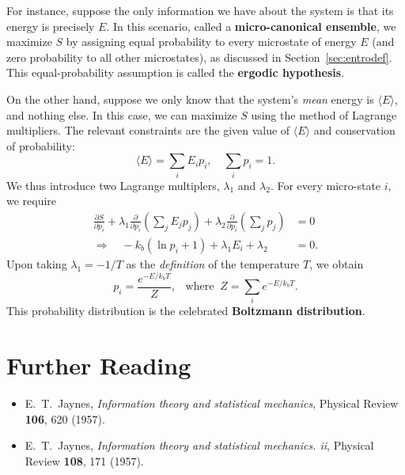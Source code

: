 \documentclass[pra,12pt]{revtex4}
\begin{document}
For instance, suppose the only information we have about the system is
that its energy is precisely $E$.  In this scenario, called a
\textbf{micro-canonical ensemble}, we maximize $S$ by assigning equal
probability to every microstate of energy $E$ (and zero probability to
all other microstates), as discussed in Section~\ref{sec:entrodef}.
This equal-probability assumption is called the \textbf{ergodic
  hypothesis}.

On the other hand, suppose we only know that the system's
\textit{mean} energy is $\langle E \rangle$, and nothing else.  In
this case, we can maximize $S$ using the method of Lagrange
multipliers.  The relevant constraints are the given value of $\langle
E \rangle$ and conservation of probability:
\begin{equation}
  \langle E \rangle = \sum_i E_i p_i, \quad
  \sum_i p_i = 1.
\end{equation}
We thus introduce two Lagrange multiplers, $\lambda_1$ and
$\lambda_2$.  For every micro-state $i$, we require
\begin{align}
  \frac{\partial S}{\partial p_i} + \lambda_1 \frac{\partial}{\partial
    p_i} \left(\sum_j E_j p_j\right)
  + \lambda_2 \frac{\partial}{\partial
    p_i} \left(\sum_j p_j\right) &= 0 \\ \Rightarrow \quad
  - k_b \left(\ln p_i + 1\right) + \lambda_1 E_i + \lambda_2 &= 0.
\end{align}
Upon taking $\lambda_1 = - 1/T$ as the \textit{definition} of the
temperature $T$, we obtain
\begin{equation}
  p_i = \frac{e^{-E/k_bT}}{Z}, \;\;\;\mathrm{where}\;\;
  Z = \sum_i e^{-E/k_b T}.
\end{equation}
This probability distribution is the celebrated \textbf{Boltzmann
  distribution}.

\section*{Further Reading}

\begin{itemize}
\item E.~T.~Jaynes, \textit{Information theory and statistical
  mechanics}, Physical Review \textbf{106}, 620 (1957).
\label{cite:jaynes}

\item E.~T.~Jaynes, \textit{Information theory and statistical
  mechanics. ii}, Physical Review \textbf{108}, 171 (1957).
\label{cite:jaynes2}
\end{itemize}
\end{document}
